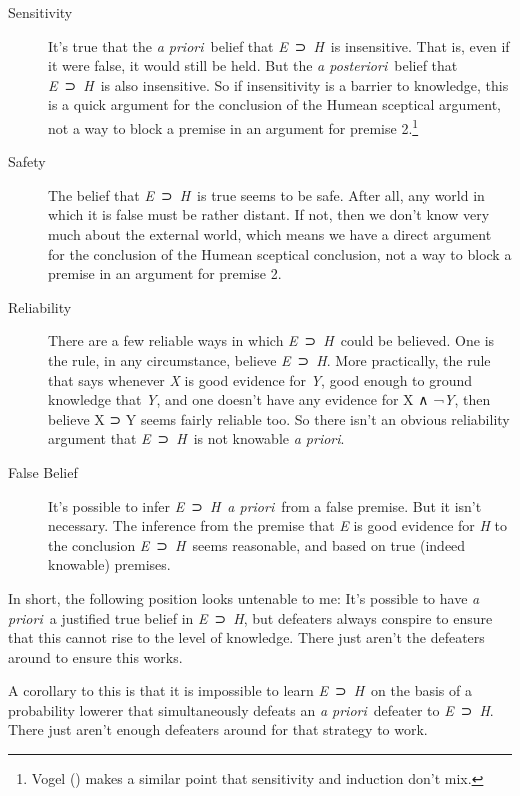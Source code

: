 \documentclass[
  10pt,
  letterpaper,
  DIV=11,
  numbers=noendperiod,
  twoside]{scrartcl}
\begin{document}
\begin{description}
\item[Sensitivity]
It's true that the \emph{a priori}~belief that \emph{E}~⊃~\emph{H}~is
insensitive. That is, even if it were false, it would still be held. But
the \emph{a posteriori}~belief that \emph{E}~⊃~\emph{H}~is also
insensitive. So if insensitivity is a barrier to knowledge, this is a
quick argument for the conclusion of the Humean sceptical argument, not
a way to block a premise in an argument for premise 2.\footnote{Vogel
  () makes a similar point that
  sensitivity and induction don't mix.}
\item[Safety]
The belief that \emph{E}~⊃~\emph{H}~is true seems to be safe. After all,
any world in which it is false must be rather distant. If not, then we
don't know very much about the external world, which means we have a
direct argument for the conclusion of the Humean sceptical conclusion,
not a way to block a premise in an argument for premise 2.
\item[Reliability]
There are a few reliable ways in which \emph{E}~⊃~\emph{H}~could be
believed. One is the rule, in any circumstance, believe
\emph{E}~⊃~\emph{H}. More practically, the rule that says whenever
\emph{X} is good evidence for \emph{Y}, good enough to ground knowledge
that \emph{Y}, and one doesn't have any evidence for X ∧ ¬\emph{Y}, then
believe X ⊃ Y seems fairly reliable too. So there isn't an obvious
reliability argument that \emph{E}~⊃~\emph{H}~is not knowable \emph{a
priori}.
\item[False Belief]
It's possible to infer \emph{E}~⊃~\emph{H}~\emph{a priori}~from a false
premise. But it isn't necessary. The inference from the premise that
\emph{E} is good evidence for \emph{H} to the conclusion
\emph{E}~⊃~\emph{H}~seems reasonable, and based on true (indeed
knowable) premises.
\end{description}

In short, the following position looks untenable to me: It's possible to
have \emph{a priori}~a justified true belief in \emph{E}~⊃~\emph{H}, but
defeaters always conspire to ensure that this cannot rise to the level
of knowledge. There just aren't the defeaters around to ensure this
works.

A corollary to this is that it is impossible to learn
\emph{E}~⊃~\emph{H}~on the basis of a probability lowerer that
simultaneously defeats an \emph{a priori}~defeater to
\emph{E}~⊃~\emph{H}. There just aren't enough defeaters around for that
strategy to work.
\end{document}
